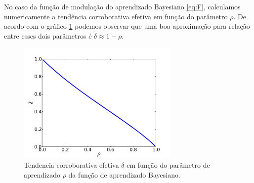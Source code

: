 No caso da função de modulação do aprendizado Bayesiano \ref{eq:F},
calculamos numericamente a tendência corroborativa efetiva em função
do parâmetro $\rho$. De acordo com o gráfico \ref{fig:delta-rho} podemos
observar que uma boa aproximação para relação entre esses dois parâmetros
é $ \tilde \delta \approx 1 - \rho $.
\begin{figure}
    \centering \includegraphics[width=0.7\textwidth]{Figures/delta-rho.pdf}
    \caption{Tendencia corroborativa efetiva $\tilde\delta$ em função do
    parâmetro de aprendizado $\rho$ da função de aprendizado Bayesiano.}
    \label{fig:delta-rho}
\end{figure}



